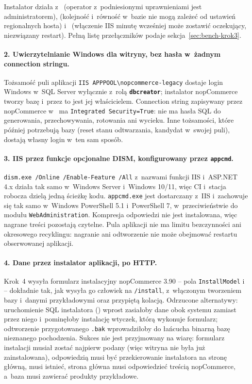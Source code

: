 Instalator działa z~
(operator z~podniesionymi uprawnieniami jest administratorem),
 (kolejność i~równość w~bazie nie
mogą zależeć od ustawień regionalnych hosta) i~
(włączenie IIS minutę wcześniej może zostawić oczekujący, niezwiązany restart). Pełną
listę przełączników podaje sekcja~\ref{sec:bench-krok3}.

\paragraph{2. Uwierzytelnianie Windows dla witryny, bez hasła w~żadnym connection
stringu.} Tożsamość puli aplikacji \texttt{IIS APPPOOL\textbackslash{}nopcommerce-legacy}
dostaje login Windows w~SQL Server wyłącznie z~rolą \textbf{\texttt{dbcreator}};
instalator nopCommerce tworzy bazę i~przez to jest jej właścicielem. Connection string
zapisywany przez nopCommerce w~ ma
\texttt{Integrated Security=True}: nie ma hasła SQL do generowania, przechowywania,
rotowania ani wycieku. Inne tożsamości, które później potrzebują bazy (reset stanu
odtwarzania, kandydat w~swojej puli), dostają własny login w~ten sam sposób.

\paragraph{3. IIS przez funkcje opcjonalne DISM, konfigurowany przez \texttt{appcmd}.}
\texttt{dism.exe /Online /Enable-Feature /All} z~nazwami funkcji IIS i~ASP.NET 4.x działa
tak samo w~Windows Server i~Windows 10/11, więc CI i~stacja robocza dzielą jedną ścieżkę
kodu. \texttt{appcmd.exe} jest dostarczany z~IIS i~zachowuje się tak samo w~Windows
PowerShell 5.1 i~PowerShell 7, w~przeciwieństwie do modułu \texttt{WebAdministration}.
Kompresja odpowiedzi nie jest instalowana, więc nagrane treści pozostają czytelne. Pula
aplikacji nie ma limitu bezczynności ani okresowego recyklingu: nagranie ani odtworzenie
nie może obejmować restartu obserwowanej aplikacji.

\paragraph{4. Dane przez instalator aplikacji, po HTTP.} Krok~4 wysyła formularz
instalacyjny nopCommerce 3.90 -- pola \texttt{InstallModel}
i~ -- dokładnie tak, jak wysyła go człowiek na
\texttt{/install}, z~włączonym tworzeniem bazy i~danymi przykładowymi oraz przypiętą
kolacją. Odrzucone alternatywy: uruchomienie SQL instalatora
() wprost zasiałoby dane obok systemu zamiast przez
niego i~pominęłoby instalację wtyczek, którą wykonuje formularz; odtworzenie
przygotowanego \texttt{.bak} wprowadziłoby do łańcucha binarną bazę nieznanego
pochodzenia. Sukces nie jest przyjmowany na wiarę: formularz instalacji musiał zostać
najpierw podany (więc witryna nie była już zainstalowana), odpowiedzią musi być
przekierowanie instalatora na stronę główną,  musi istnieć,
strona główna musi odpowiedzieć treścią nopCommerce, a~baza musi zawierać produkty
przykładowe.

